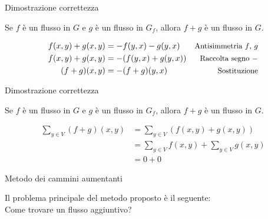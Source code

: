 \begin{frame}{Dimostrazione correttezza}

\vspace{-9pt}
\begin{myboxtitle}[Lemma]
Se $f$ è un flusso in $G$ e $g$ è un flusso in $G_f$, allora
$f+g$ è un flusso in $G$.
\end{myboxtitle}

\begin{myboxtitle}
\small
\begin{align*}
f(x,y)+g(x,y) &= -f(y,x)-g(y,x) & \textrm{\small Antisimmetria $f$, $g$} \\
f(x,y)+g(x,y) &= -(f(y,x) + g(y,x)) & \textrm{\small Raccolta segno $-$} \\
(f+g)(x,y) &= -(f+g)(y,x) & \textrm{\small Sostituzione} 
\end{align*}
\end{myboxtitle}

\end{frame}

\begin{frame}{Dimostrazione correttezza}

\vspace{-9pt}
\begin{myboxtitle}[Lemma]
Se $f$ è un flusso in $G$ e $g$ è un flusso in $G_f$, allora
$f+g$ è un flusso in $G$.
\end{myboxtitle}

\begin{myboxtitle}
\small
\begin{align*}
  \sum_{y \in V} (f+g)(x,y) &= \sum_{y \in V} (f(x,y) + g(x,y)) \\
  &= \sum_{y \in V} f(x,y) + \sum_{y \in V} g(x,y) \\
   &= 0 + 0
\end{align*}
\end{myboxtitle}

\end{frame}

\begin{frame}{Metodo dei cammini aumentanti}

\vspace{-9pt}
\begin{myboxtitle}[Domanda]
Il problema principale del metodo proposto è il seguente:\\ 
\alert{Come trovare un 
flusso aggiuntivo}? 
\end{myboxtitle}

\begin{center}
\end{center}

\end{frame}

